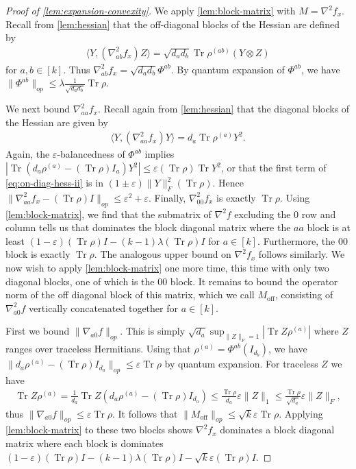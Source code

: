 \documentclass[aos]{imsart}
\theoremstyle{definition}
\numberwithin{equation}{section}
\DeclareMathOperator{\tr}{Tr}
\newcommand{\ot}{\otimes}
\newcommand{\eps}{\varepsilon}
\newcommand{\samp}{x}
\begin{document}
 \begin{proof}[Proof of \cref{lem:expansion-convexity}]  We apply \cref{lem:block-matrix} with $M = \nabla^2 f_\samp$. Recall from \cref{lem:hessian} that the off-diagonal blocks of the Hessian are defined by
\begin{align} \langle Y,  \left( \nabla^2_{ab} f_{\samp} \right) Z \rangle
= \sqrt{d_a d_b} \tr \rho^{(ab)} \left( Y \ot Z \right) \label{eq:grad-off-diag}\end{align}
for $a, b \in [k]$. Thus $\nabla^2_{ab} f_{\samp} = \sqrt{d_a d_b} \Phi^{ab}.$ By quantum expansion of $\Phi^{ab}$, we have $\|\Phi^{ab}\|_{op} \leq \lambda \frac{1}{\sqrt{d_a d_b}} \tr \rho$. 

We next bound $\nabla_{aa}^2 f_\samp$. Recall again from \cref{lem:hessian} that the diagonal blocks of the Hessian are given by \begin{align}
 \langle Y,  \left( \nabla^2_{aa} f_{\samp} \right) Y \rangle=  d_a \tr \rho^{(a)} Y^2 .\label{eq:on-diag-hess-ii}
\end{align}
Again, the $\eps$-balancedness of $\Phi^{ab}$ implies $ |\tr (d_a \rho^{(a)}  - (\tr \rho) I_a)Y^2| \leq \eps (\tr \rho) \tr Y^2$, or that the first term of \cref{eq:on-diag-hess-ii} is in $(1 \pm \eps) \|Y\|_F^2 (\tr \rho)$. Hence $\|\nabla_{aa}^2 f_\samp - (\tr \rho) I\|_{op} \leq \eps^2 + \eps$. Finally, $\nabla_{00}^2 f_\samp$ is exactly $\tr \rho$. Using \cref{lem:block-matrix}, we find that the submatrix of $\nabla^2 f$ excluding the $0$ row and column tells us that dominates the block diagonal matrix where the $aa$ block is at least $(1 - \eps) (\tr \rho) I - (k-1) \lambda (\tr \rho) I $ for $a \in [k]$. Furthermore, the 00 block is exactly $ \tr \rho$. The analogous upper bound on $\nabla^2 f_\samp$ follows similarly. We now wish to apply \cref{lem:block-matrix} one more time, this time with only two diagonal blocks, one of which is the 00 block. It remains to bound the operator norm of the off diagonal block of this matrix, which we call $M_{\text{off}}$, consisting of $\nabla_{a 0}^2 f$ vertically concatenated together for $a \in [k]$. 

First we bound $\|\nabla_{a0} f\|_{op}$. This is simply $\sqrt{d_a}\sup_{\|Z\|_F = 1} |\tr Z \rho^{(a)}|$ where $Z$ ranges over traceless Hermitians. Using that $\rho^{(a)} = \Phi^{ab}(I_{d_b})$, we have $\|d_a \rho^{(a)} - (\tr \rho) I_{d_a}\|_{op} \leq \eps \tr \rho $ by quantum expansion. For traceless $Z$ we have 
\begin{align}\tr Z \rho^{(a)} = \frac{1}{d_a} \tr Z (d_a \rho^{(a)} - (\tr \rho) I_{d_a}) \leq \frac{\tr \rho}{d_a} \eps \|Z\|_1 \leq \frac{\tr \rho}{\sqrt{d_a}} \eps \|Z\|_F,\label{eq:second-term-hess}\end{align}
thus $\|\nabla_{a0} f\|_{op} \leq \eps \tr \rho$. It follows that $\|M_{\text{off}}\|_{op} \leq \sqrt{k} \eps \tr \rho$. Applying \cref{lem:block-matrix} to these two blocks shows $\nabla^2 f_\samp$ dominates a block diagonal matrix where each block is dominates $(1 - \eps) (\tr \rho) I - (k-1) \lambda (\tr \rho) I  - \sqrt{k} \eps (\tr \rho) I.$ 
 \end{proof}
\end{document}
